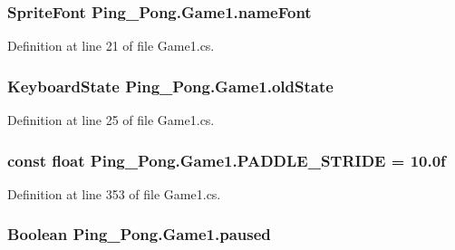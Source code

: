 \hypertarget{class_ping___pong_1_1_game1_a1f794b8a0feab9dfdbf4c98dc86222cf}{
\subsubsection[{name\-Font}]{\setlength{\rightskip}{0pt plus 5cm}Sprite\-Font Ping\-\_\-\-Pong.\-Game1.\-name\-Font\hspace{0.3cm}{\ttfamily [private]}}}\label{class_ping___pong_1_1_game1_a1f794b8a0feab9dfdbf4c98dc86222cf}


Definition at line 21 of file Game1.\-cs.

\hypertarget{class_ping___pong_1_1_game1_a13ba97510380dfbf6c00815f4d5af7ad}{
\subsubsection[{old\-State}]{\setlength{\rightskip}{0pt plus 5cm}Keyboard\-State Ping\-\_\-\-Pong.\-Game1.\-old\-State\hspace{0.3cm}{\ttfamily [private]}}}\label{class_ping___pong_1_1_game1_a13ba97510380dfbf6c00815f4d5af7ad}


Definition at line 25 of file Game1.\-cs.

\hypertarget{class_ping___pong_1_1_game1_a4613e5c643f7d89e1d4dabb2b383bfad}{
\subsubsection[{P\-A\-D\-D\-L\-E\-\_\-\-S\-T\-R\-I\-D\-E}]{\setlength{\rightskip}{0pt plus 5cm}const float Ping\-\_\-\-Pong.\-Game1.\-P\-A\-D\-D\-L\-E\-\_\-\-S\-T\-R\-I\-D\-E = 10.\-0f\hspace{0.3cm}{\ttfamily [private]}}}\label{class_ping___pong_1_1_game1_a4613e5c643f7d89e1d4dabb2b383bfad}


Definition at line 353 of file Game1.\-cs.

\hypertarget{class_ping___pong_1_1_game1_a87f945d8a88fa041a94fe15c1446173e}{
\subsubsection[{paused}]{\setlength{\rightskip}{0pt plus 5cm}Boolean Ping\-\_\-\-Pong.\-Game1.\-paused\hspace{0.3cm}{\ttfamily [private]}}}\label{class_ping___pong_1_1_game1_a87f945d8a88fa041a94fe15c1446173e}


